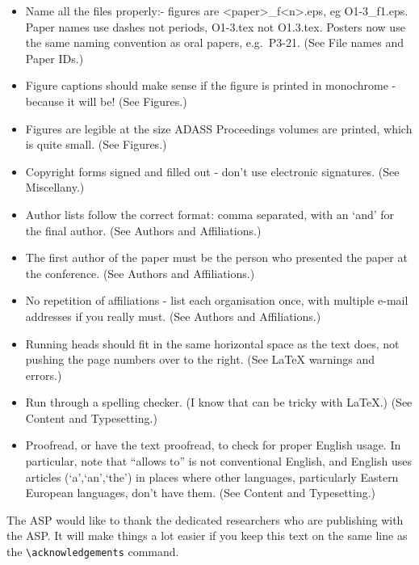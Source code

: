 \documentclass[11pt,twoside]{article}
\begin{document}
\begin{itemize}
\item Name all the files properly:- figures are <paper>\_f<n>.eps, eg O1-3\_f1.eps. Paper names use dashes not periods, O1-3.tex not O1.3.tex. Posters now use the same naming convention as oral papers, e.g.\ P3-21. (See File names and Paper IDs.)
\item Figure captions should make sense if the figure is printed in monochrome - because it will be! (See Figures.)
\item Figures are legible at the size ADASS Proceedings volumes are printed, which is quite small. (See Figures.)
\item Copyright forms signed and filled out - don't use electronic signatures. (See Miscellany.)
\item Author lists follow the correct format: comma separated, with an `and' for the final author. (See Authors and Affiliations.)
\item The first author of the paper must be the person who presented the paper at the conference. (See Authors and Affiliations.)
\item No repetition of affiliations - list each organisation once, with multiple e-mail addresses if you really must. (See Authors and Affiliations.)
\item Running heads should fit in the same horizontal space as the text does, not pushing the page numbers over to the right. (See LaTeX warnings and errors.)
\item Run through a spelling checker. (I know that can be tricky with LaTeX.) (See Content and Typesetting.)
\item Proofread, or have the text proofread, to check for proper English usage. In particular, note that ``allows to'' is not conventional English, and English uses articles (`a',`an',`the') in places where other languages, particularly Eastern European languages, don't have them. (See Content and Typesetting.)
\end{itemize}

\acknowledgements The ASP would like to thank the dedicated researchers who are publishing with the ASP.  It will make things a lot easier if you keep this text on the same line as the \verb"\acknowledgements" command.


\end{document}
